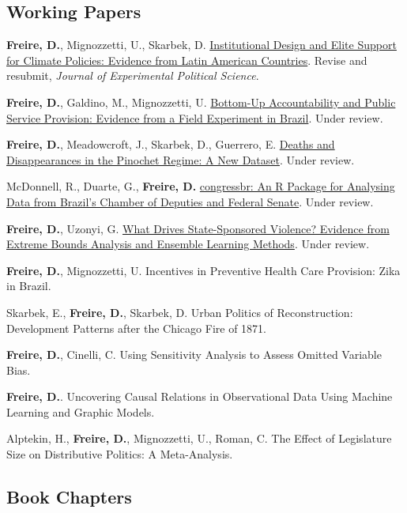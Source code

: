 \documentclass[a4paper]{article}
\renewenvironment{itemize}{
	\begin{list}{}{
			\setlength{\leftmargin}{1.5em}
		}
		}{
	\end{list}
}
\begin{document}
	\subsection*{Working Papers}

	\begin{itemize}
		\item \textbf{Freire, D.}, Mignozzetti, U., Skarbek, D. \href{https://doi.org/10.31235/osf.io/9a6ch}{Institutional Design and Elite Support for Climate Policies: Evidence from Latin American Countries}. Revise and resubmit, \textit{Journal of Experimental Political Science}.
		\item \textbf{Freire, D.}, Galdino, M., Mignozzetti, U. \href{https://github.com/umbertomig/tdp-accountability}{Bottom-Up Accountability and Public Service Provision: Evidence from a Field Experiment in Brazil}. Under review.
		\item \textbf{Freire, D.}, Meadowcroft, J., Skarbek, D., Guerrero, E. \href{https://github.com/danilofreire/pinochet}{Deaths and Disappearances in the Pinochet Regime: A New Dataset}. Under review. 
		\item McDonnell, R., Duarte, G., \textbf{Freire, D.} \href{https://osf.io/n5jd8}{congressbr: An R Package for Analysing Data from Brazil's Chamber of Deputies and Federal Senate}. Under review.
		\item \textbf{Freire, D.}, Uzonyi, G. \href{https://osf.io/pzx3q}{What Drives State-Sponsored Violence? Evidence from Extreme Bounds Analysis and Ensemble Learning Methods}. Under review.
		\item \textbf{Freire, D.}, Mignozzetti, U. Incentives in Preventive Health Care Provision: Zika in Brazil. 
		\item Skarbek, E., \textbf{Freire, D.}, Skarbek, D. Urban Politics of Reconstruction: Development Patterns after the Chicago Fire of 1871.
		\item \textbf{Freire, D.}, Cinelli, C. Using Sensitivity Analysis to Assess Omitted Variable Bias.
		\item \textbf{Freire, D.}. Uncovering Causal Relations in Observational Data Using Machine Learning and Graphic Models.
		\item Alptekin, H., \textbf{Freire, D.}, Mignozzetti, U., Roman, C. The Effect of Legislature Size on Distributive Politics: A Meta-Analysis.
	\end{itemize}

	\subsection*{Book Chapters}
\end{document}
